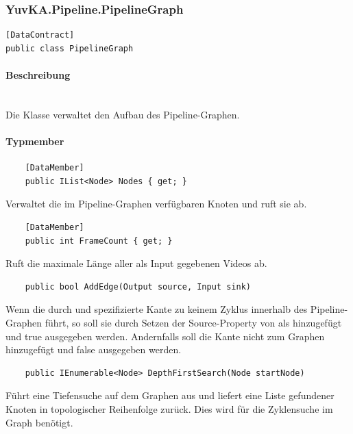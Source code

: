 \subsubsection{YuvKA.Pipeline.PipelineGraph}
	
\begin{verbatim}
[DataContract]
public class PipelineGraph	
\end{verbatim}

\paragraph{Beschreibung}~\\
Die Klasse  verwaltet den Aufbau des Pipeline-Graphen. 
	
\paragraph{Typmember}
\begin{itemize}

	\begin{verbatim}
	[DataMember]
	public IList<Node> Nodes { get; }
	\end{verbatim}
	Verwaltet die im Pipeline-Graphen verfügbaren Knoten und ruft sie ab.

	\begin{verbatim}
	[DataMember]
	public int FrameCount { get; }
	\end{verbatim}
	Ruft die maximale Länge aller als Input gegebenen Videos ab.


	
	\begin{verbatim}
	public bool AddEdge(Output source, Input sink)
	\end{verbatim}
	Wenn die durch  und  spezifizierte Kante zu keinem Zyklus innerhalb des Pipeline-Graphen führt, so soll sie durch Setzen der Source-Property von  als  hinzugefügt und true ausgegeben werden. Andernfalls soll die Kante nicht zum Graphen hinzugefügt und false ausgegeben werden.

    \begin{verbatim}
    public IEnumerable<Node> DepthFirstSearch(Node startNode)
    \end{verbatim}
    Führt eine Tiefensuche auf dem Graphen aus und liefert eine Liste gefundener Knoten in topologischer Reihenfolge zurück. Dies wird für die Zyklensuche im Graph benötigt.

\end{itemize}
	
